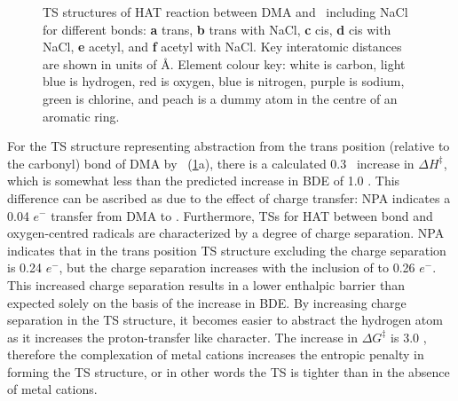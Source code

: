 \begin{figure}[!htbp]\ContinuedFloat

  \caption[TS structures of HAT reaction between DMA and \cumo\ including and
  excluding NaCl.]{TS structures of HAT reaction between DMA and \cumo\
  including NaCl for different  bonds: \textbf{a} trans, \textbf{b}
  trans with NaCl, \textbf{c} cis, \textbf{d} cis with NaCl, \textbf{e} acetyl,
  and \textbf{f} acetyl with NaCl. Key interatomic distances are shown in units
  of \AA. Element colour key: white is carbon, light blue is hydrogen, red is
  oxygen, blue is nitrogen, purple is sodium, green is chlorine, and peach is a
  dummy atom in the centre of an aromatic ring.} \label{fig:dma-cumo-ts}
\end{figure}

For the TS structure representing abstraction from the trans position (relative
to the carbonyl) \ch{C-H} bond of DMA by \cumo\ (\ref{fig:dma-cumo-ts}a), there
is a calculated 0.3 \kcalmol\ increase in $\Delta H^\ddagger$, which is
somewhat less than the predicted increase in BDE of 1.0 \kcalmol. This
difference can be ascribed as due to the effect of charge transfer: NPA
indicates a 0.04 $e^-$ transfer from DMA to \ch{Na^+}. Furthermore, TSs for HAT
between \ch{C-H} bond and oxygen-centred radicals are characterized by a degree
of charge separation.\cite{Roberts1999} NPA indicates that in the trans
position TS structure excluding  the charge separation is 0.24 $e^-$,
but the charge separation increases with the inclusion of \ch{NaCl} to 0.26
$e^-$. This increased charge separation results in a lower enthalpic barrier
than expected solely on the basis of the increase in \ch{C-H} BDE. By
increasing charge separation in the TS structure, it becomes easier to abstract
the hydrogen atom as it increases the proton-transfer like character. The
increase in $\Delta G^\ddagger$ is 3.0 \kcalmol, therefore the complexation of
metal cations increases the entropic penalty in forming the TS structure, or in
other words the TS is tighter than in the absence of metal cations.

